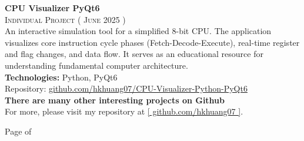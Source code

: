 \documentclass[oneside]{article}
\begin{document}
{\begin{minipage}[t][\dimexpr\textheight-2\fboxrule-2\fboxsep\relax][t]{\dimexpr0.6\textwidth-2\fboxrule-2\fboxsep\relax}
\begin{justify}
        {\large \textbf{CPU Visualizer \textendash{} PyQt6}} \\
        {\scshape{}\selectfont\footnotesize Individual Project \qquad ( June 2025 )} \\
        An interactive simulation tool for a simplified 8-bit CPU. The application visualizes core instruction cycle phases (Fetch-Decode-Execute), real-time register and flag changes, and data flow. It serves as an educational resource for understanding fundamental computer architecture. \\[1ex]
        \textbf{Technologies:} Python, PyQt6\\
        Repository: \href{https://github.com/hkhuang07/CPU-Visualizer-Python-PyQt6}{github.com/hkhuang07/CPU-Visualizer-Python-PyQt6}\\
        
        {\large \textbf{There are many other interesting projects on Github}} \\
        For more, please visit my repository at \href{https://github.com/hkhuang07}{[ github.com/hkhuang07 ]}.
        
        \end{justify}
        \vfill%
        {\hfill\small{}\selectfont Page \thepage of \pageref{LastPage}\hfill}
    \end{minipage}
}
\hfill%
\end{document}
